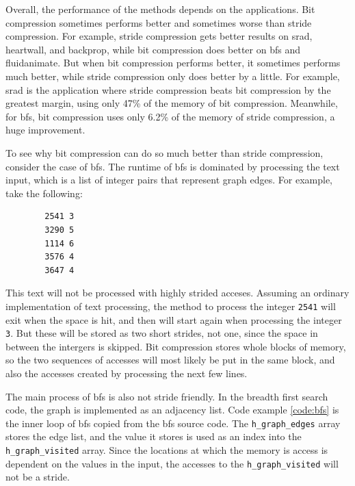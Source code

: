\documentclass[12pt,twoside]{reedthesis}
\begin{document}
		Overall, the performance of the methods depends on the applications. Bit compression sometimes performs better and sometimes worse than stride compression. For example, stride compression gets better results on srad, heartwall, and backprop, while bit compression does better on bfs and fluidanimate. But when bit compression performs better, it sometimes performs much better, while stride compression only does better by a little. For example, srad is the application where stride compression beats bit compression by the greatest margin, using only 47\% of the memory of bit compression. Meanwhile, for bfs, bit compression uses only 6.2\% of the memory of stride compression, a huge improvement.
		
		To see why bit compression can do so much better than stride compression, consider the case of bfs. The runtime of bfs is dominated by processing the text input, which is a list of integer pairs that represent graph edges. For example, take the following:
		
		\begin{verbatim}
		2541 3
		3290 5
		1114 6
		3576 4
		3647 4
		\end{verbatim}
		
		This text will not be processed with highly strided acceses.
		Assuming an ordinary implementation of text processing, the method to process the integer \texttt{2541} will exit when the space is hit, and then will start again when processing the integer \texttt{3}. But these will be stored as two short strides, not one, since the space in between the intergers is skipped. Bit compression stores whole blocks of memory, so the two sequences of accesses will most likely be put in the same block, and also the accesses created by processing the next few lines. %
		
		The main process of bfs is also not stride friendly. In the breadth first search code, the graph is implemented as an adjacency list. 
		Code example \ref{code:bfs} is the inner loop of bfs copied from the bfs source code. The \texttt{h\_graph\_edges} array stores the edge list, and the value it stores is used as an index into the \texttt{h\_graph\_visited} array. Since the locations at which the memory is access is dependent on the values in the input, the accesses to the \texttt{h\_graph\_visited} will not be a stride. 
		
\end{document}

